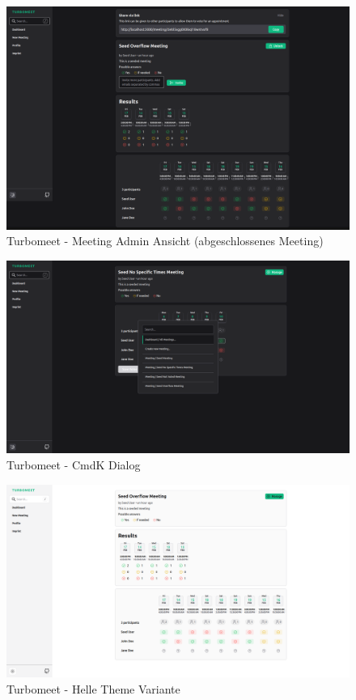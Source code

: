 \begin{figure}[th]
    \centering
    \includegraphics[width=\textwidth]{Figures/turbomeet_desktop_meeting_admin_closed.png}
    \decoRule
    \caption{Turbomeet - Meeting Admin Ansicht (abgeschlossenes Meeting)}
    \label{fig:turbomeet_desktop_meeting_admin_closed}
\end{figure}

\begin{figure}[th]
    \centering
    \includegraphics[width=\textwidth]{Figures/turbomeet_desktop_cmdk.png}
    \decoRule
    \caption{Turbomeet - CmdK Dialog}
    \label{fig:turbomeet_desktop_cmdk}
\end{figure}

\begin{figure}[th]
    \centering
    \includegraphics[width=\textwidth]{Figures/turbomeet_desktop_light_theme.png}
    \decoRule
    \caption{Turbomeet - Helle Theme Variante}
    \label{fig:turbomeet_desktop_light_theme}
\end{figure}